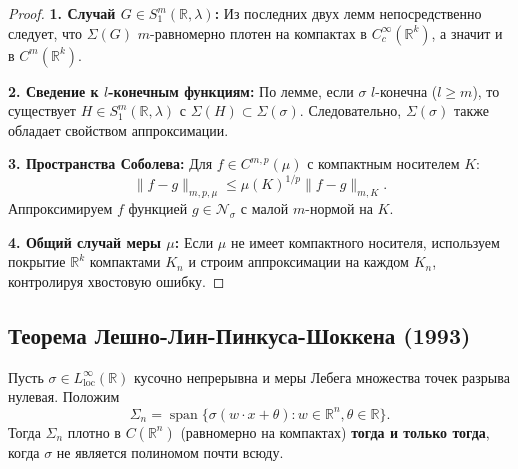 \documentclass[../NDCNNAI_main.tex]{subfiles}
\begin{document}
\begin{proof}
\textbf{1. Случай $G \in S^m_1(\mathbb{R}, \lambda)$:} Из последних двух лемм непосредственно следует, что $\Sigma(G)$ $m$-равномерно плотен на компактах в $C^\infty_c(\mathbb{R}^k)$, а значит и в $C^m(\mathbb{R}^k)$.

\textbf{2. Сведение к $l$-конечным функциям:} По лемме, если $\sigma$ $l$-конечна ($l \geq m$), то существует $H \in S^m_1(\mathbb{R}, \lambda)$ с $\Sigma(H) \subset \Sigma(\sigma)$. Следовательно, $\Sigma(\sigma)$ также обладает свойством аппроксимации.

\textbf{3. Пространства Соболева:} Для $f \in C^{m,p}(\mu)$ с компактным носителем $K$:
\[
\|f - g\|_{m,p,\mu} \leq \mu(K)^{1/p} \|f - g\|_{m,K}.
\]
Аппроксимируем $f$ функцией $g \in \mathcal{N}_\sigma$ с малой $m$-нормой на $K$.

\textbf{4. Общий случай меры $\mu$:} Если $\mu$ не имеет компактного носителя, используем покрытие $\mathbb{R}^k$ компактами $K_n$ и строим аппроксимации на каждом $K_n$, контролируя хвостовую ошибку.
\end{proof}

\subsection{Теорема Лешно-Лин-Пинкуса-Шоккена (1993)}

\begin{theorem}
Пусть $\sigma \in L^\infty_{\text{loc}}(\mathbb{R})$ кусочно непрерывна и меры Лебега множества точек разрыва нулевая. Положим
\[
\Sigma_n = \operatorname*{span}\{\sigma(w \cdot x + \theta): w \in \mathbb{R}^n, \theta \in \mathbb{R}\}.
\]
Тогда $\Sigma_n$ плотно в $C(\mathbb{R}^n)$ (равномерно на компактах) \textbf{тогда и только тогда}, когда $\sigma$ не является полиномом почти всюду.
\end{theorem}
\end{document}
